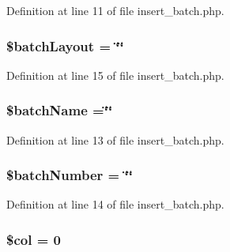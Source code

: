 Definition at line 11 of file insert\-\_\-batch.\-php.

\hypertarget{insert__batch_8php_a6fa65e8ebf49b9db3eaf85cfd31d1908}{
\subsubsection[{\$batch\-Layout}]{\setlength{\rightskip}{0pt plus 5cm}\$batch\-Layout = \char`\"{}\char`\"{}}}\label{insert__batch_8php_a6fa65e8ebf49b9db3eaf85cfd31d1908}


Definition at line 15 of file insert\-\_\-batch.\-php.

\hypertarget{insert__batch_8php_ae0139f42f02473374ecb453f87c66534}{
\subsubsection[{\$batch\-Name}]{\setlength{\rightskip}{0pt plus 5cm}\${\bf batch\-Name} =\char`\"{}\char`\"{}}}\label{insert__batch_8php_ae0139f42f02473374ecb453f87c66534}


Definition at line 13 of file insert\-\_\-batch.\-php.

\hypertarget{insert__batch_8php_a5efc7692d3e718869a2ba3a55876129c}{
\subsubsection[{\$batch\-Number}]{\setlength{\rightskip}{0pt plus 5cm}\$batch\-Number = \char`\"{}\char`\"{}}}\label{insert__batch_8php_a5efc7692d3e718869a2ba3a55876129c}


Definition at line 14 of file insert\-\_\-batch.\-php.

\hypertarget{insert__batch_8php_afca5b7d4c9144178253e99d0ada7d519}{
\subsubsection[{\$col}]{\setlength{\rightskip}{0pt plus 5cm}\$col = 0}}\label{insert__batch_8php_afca5b7d4c9144178253e99d0ada7d519}


